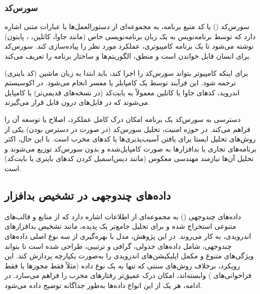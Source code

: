 \subsubsection{سورس‌کد}
سورس‌کد () یا کد منبع برنامه، به مجموعه‌ای از دستورالعمل‌ها یا عبارات متنی اشاره دارد که توسط برنامه‌نویس به یک زبان برنامه‌نویسی خاص (مانند جاوا، کاتلین، ، پایتون) نوشته می‌شود تا یک برنامه کامپیوتری، عملکرد مورد نظر را پیاده‌سازی کند. سورس‌کد برای انسان قابل خواندن است و منطق، الگوریتم‌ها و ساختار برنامه را تعریف می‌کند.

برای اینکه کامپیوتر بتواند سورس‌کد را اجرا کند، باید ابتدا به زبان ماشین (کد باینری) ترجمه شود. این فرآیند توسط یک کامپایلر یا مفسر انجام می‌شود. در اکوسیستم اندروید، کدهای جاوا یا کاتلین معمولاً به بایت‌کد  (در نسخه‌های قدیمی‌تر) یا   کامپایل می‌شوند که در فایل‌های  درون فایل  قرار می‌گیرند.

دسترسی به سورس‌کد یک برنامه امکان درک کامل عملکرد، اصلاح یا توسعه آن را فراهم می‌کند. در حوزه امنیت، تحلیل سورس‌کد (در صورت در دسترس بودن) یکی از روش‌های تحلیل ایستا برای یافتن آسیب‌پذیری‌ها یا کدهای مخرب است. با این حال، اکثر برنامه‌های تجاری یا بدافزارها به صورت کامپایل‌شده و بدون سورس‌کد توزیع می‌شوند و تحلیل آن‌ها نیازمند مهندسی معکوس (مانند دیس‌اسمبل کردن کدهای باینری یا بایت‌کد) است.

\subsection{داده‌های چندوجهی در تشخیص بدافزار}
داده‌های چندوجهی () به مجموعه‌ای از اطلاعات اشاره دارد که از منابع و قالب‌های متنوعی استخراج شده و برای تحلیل جامع‌تر یک پدیده، مانند تشخیص بدافزارهای اندرویدی، به کار می‌روند. در این پژوهش، مدل  با بهره‌گیری از سه نوع اصلی داده‌های چندوجهی، شامل داده‌های جدولی، گرافی و ترتیبی، طراحی شده است تا بتواند ویژگی‌های متنوع و مکمل اپلیکیشن‌های اندرویدی را به‌صورت یکپارچه پردازش کند. این رویکرد، برخلاف روش‌های سنتی که تنها به یک نوع داده (مثلاً فقط مجوزها یا فقط فراخوانی‌های ) وابسته‌اند، امکان درک عمیق‌تر رفتارهای مخرب را فراهم می‌سازد. در ادامه، هر یک از این انواع داده‌ها به‌طور جداگانه توضیح داده می‌شود.

